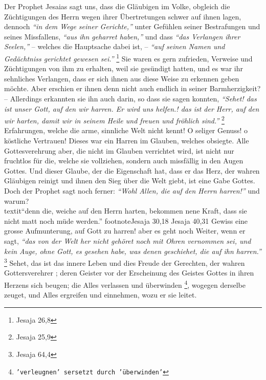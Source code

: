 Der Prophet Jesaias sagt uns, dass die Gläubigen im Volke, obgleich die
Züchtigungen des Herrn wegen ihrer Übertretungen schwer auf ihnen lagen,
dennoch
\textit{"`in dem Wege seiner Gerichte,"'} unter Gefühlen seiner Bestrafungen und
seines Missfallens, \textit{"`aus ihn geharret haben,"'} und dass \textit{"`das
Verlangen ihrer Seelen,"'} -- welches die Hauptsache dabei ist, --
\textit{"`auf seinen Namen und Gedächtniss gerichtet gewesen sei."'}
\footnote{Jesaja 26,8}
Sie waren es gern
zufrieden, Verweise und Züchtigungen von ihm zu erhalten, weil sie gesündigt
hatten, und es war ihr sehnliches Verlangen, dass er sich ihnen aus diese Weise
zu erkennen geben möchte. Aber erschien er ihnen denn
nicht auch endlich in
seiner Barmherzigkeit?  -- Allerdings erkannten sie ihn auch darin, so dass sie
sagen konnten,
\textit{"`Sehet! das ist unser Gott, auf den wir harren. Er wird uns
helfen.! das ist der Herr, auf den wir harten, damit wir in seinem Heile und
freuen und fröhlich sind."'}
\footnote{Jesaja 25,9}
Erfahrungen, welche die arme,
sinnliche Welt nicht kennt!  O seliger Genuss! o köstliche
Vertrauen! Dieses war
ein Harren im Glauben, welches obsiegte. Alle Gottesverehrung aber, die nicht im
Glauben verrichtet wird, ist nicht nur fruchtlos  für die, welche sie vollziehen,
sondern auch missfällig in den Augen Gottes. Und dieser Glaube, der die
Eigenschaft hat, dass er das Herz, der wahren Gläubigen reinigt und ihnen den
Sieg über die Welt giebt, ist eine Gabe Gottes. Doch
der Prophet sagt noch
ferner:
\textit{"`Wohl Allen, die auf den Herrn harren!"'} und warum?\\textit{"`denn
die, weiche
auf den Herrn harten, bekommen nene Kraft, dass sie nicht matt noch müde
werden."'}
footnote{Jesaja 30,18 Jesaja 40,31}
Gewiss eine grosse Aufmunterung, auf Gott
zu harren! aber es geht noch Weiter, wenn er sagt,
\textit{"`das von der Welt her
nicht gehöret noch mit Ohren vernommen sei, und kein Auge, ohne Gott, es gesehen
habe, was denen geschiehet, die auf ihn harren."'}
\footnote{Jesaja 64,4}
Sehet, das ist das innere Leben und dies Freude der Gerechten, der wahren
Gottersverehrer ;
deren Geister vor der Erscheinung des Geistes Gottes in ihren Herzens sich
beugen; die Alles verlassen und überwinden \footnote{\texttt{'verleugnen' sersetzt
durch 'überwinden'}}, wogegen derselbe zeuget, und Alles
ergreifen und einnehmen, wozu er sie leitet.

